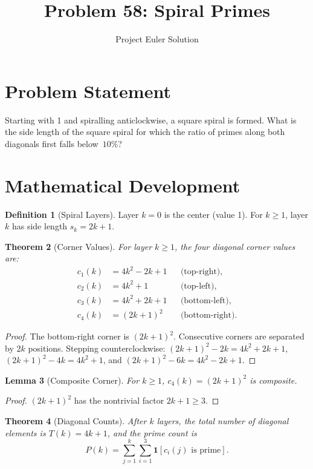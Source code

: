 \documentclass[12pt,a4paper]{article}
\title{Problem 58: Spiral Primes}
\author{Project Euler Solution}
\date{}
\newtheorem{theorem}{Theorem}
\newtheorem{lemma}[theorem]{Lemma}
\theoremstyle{definition}
\newtheorem{definition}[theorem]{Definition}
\theoremstyle{remark}
\begin{document}
\maketitle

\section{Problem Statement}
Starting with 1 and spiralling anticlockwise, a square spiral is formed. What is the side length of the square spiral for which the ratio of primes along both diagonals first falls below~$10\%$?

\section{Mathematical Development}

\begin{definition}[Spiral Layers]
Layer $k = 0$ is the center (value 1). For $k \geq 1$, layer $k$ has side length $s_k = 2k + 1$.
\end{definition}

\begin{theorem}[Corner Values]
For layer $k \geq 1$, the four diagonal corner values are:
\begin{align}
c_1(k) &= 4k^2 - 2k + 1 && \text{(top-right)}, \\
c_2(k) &= 4k^2 + 1 && \text{(top-left)}, \\
c_3(k) &= 4k^2 + 2k + 1 && \text{(bottom-left)}, \\
c_4(k) &= (2k+1)^2 && \text{(bottom-right)}.
\end{align}
\end{theorem}

\begin{proof}
The bottom-right corner is $(2k+1)^2$. Consecutive corners are separated by $2k$ positions. Stepping counterclockwise: $(2k+1)^2 - 2k = 4k^2 + 2k + 1$, $(2k+1)^2 - 4k = 4k^2 + 1$, and $(2k+1)^2 - 6k = 4k^2 - 2k + 1$.
\end{proof}

\begin{lemma}[Composite Corner]
For $k \geq 1$, $c_4(k) = (2k+1)^2$ is composite.
\end{lemma}

\begin{proof}
$(2k+1)^2$ has the nontrivial factor $2k+1 \geq 3$.
\end{proof}

\begin{theorem}[Diagonal Counts]
After $k$ layers, the total number of diagonal elements is $T(k) = 4k + 1$, and the prime count is
\[
P(k) = \sum_{j=1}^{k} \sum_{i=1}^{3} \mathbf{1}[c_i(j) \text{ is prime}].
\]
\end{theorem}
\end{document}
